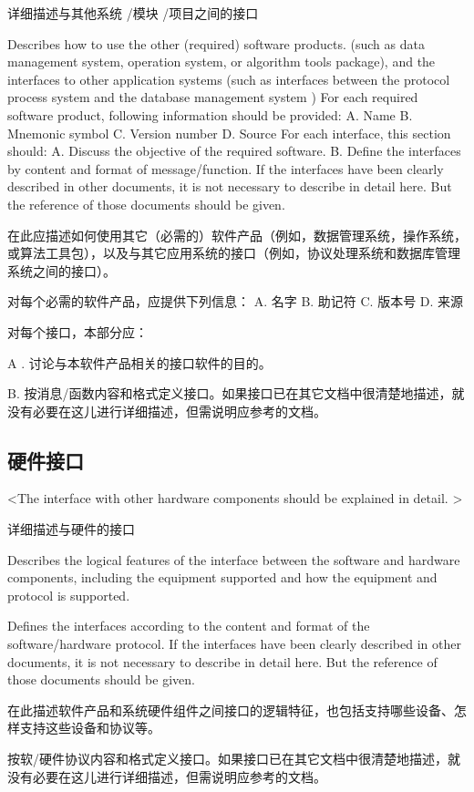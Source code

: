 详细描述与其他系统 /模块 /项目之间的接口

Describes how to use the other (required) software products. (such as data management system, operation system, or algorithm tools package), and the interfaces to other application systems (such as interfaces between the protocol process system and the database management system )
For each required software product, following information should be provided:
A. Name
B. Mnemonic symbol
C. Version number
D. Source
For each interface, this section should:
A. Discuss the objective of the required software.
B. Define the interfaces by content and format of message/function. If the interfaces have been clearly described in other documents, it is not necessary to describe in detail here. But the reference of those documents should be given.

在此应描述如何使用其它（必需的）软件产品（例如，数据管理系统，操作系统，或算法工具包），以及与其它应用系统的接口（例如，协议处理系统和数据库管理系统之间的接口）。

对每个必需的软件产品，应提供下列信息：
A.	名字
B.	助记符
C.	版本号
D.	来源

对每个接口，本部分应：

A .	讨论与本软件产品相关的接口软件的目的。

B.	按消息/函数内容和格式定义接口。如果接口已在其它文档中很清楚地描述，就没有必要在这儿进行详细描述，但需说明应参考的文档。

\subsection{硬件接口}
<The interface with other hardware components should be explained in detail. >

详细描述与硬件的接口

Describes the logical features of the interface between the software and hardware components, including the equipment supported and how the equipment and protocol is supported. 

Defines the interfaces according to the content and format of the software/hardware protocol. If the interfaces have been clearly described in other documents, it is not necessary to describe in detail here. But the reference of those documents should be given.

在此描述软件产品和系统硬件组件之间接口的逻辑特征，也包括支持哪些设备、怎样支持这些设备和协议等。
 
按软/硬件协议内容和格式定义接口。如果接口已在其它文档中很清楚地描述，就没有必要在这儿进行详细描述，但需说明应参考的文档。

